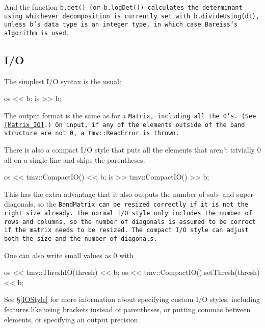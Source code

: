 And the function \tt{b.det()} (or \tt{b.logDet()}) calculates the determinant
using whichever decomposition is currently set with \tt{b.divideUsing(dt)},
unless \tt{b}'s data type is an integer type, in which case Bareiss's algorithm 
is used.

\subsection{I/O}
\label{BandMatrix_IO}

The simplest I/O syntax is the usual:
\begin{tmvcode}
os << b;
is >> b;
\end{tmvcode}
The output format is the same as for a \tt{Matrix}, including all the 0's.
(See \ref{Matrix_IO}.)  On input, if any of the elements outside of the band structure
are not 0, a \tt{tmv::ReadError} is thrown.

There is also a compact I/O style that puts all the elements that aren't trivially 0 all on a single line and skips the parentheses. 
\begin{tmvcode}
os << tmv::CompactIO() << b;
is >> tmv::CompactIO() >> b;
\end{tmvcode}
This has the extra advantage that it also outputs the number of sub- and super-diagonals, so the \tt{BandMatrix} can be resized correctly if it is not the right size already.  The normal I/O style only includes the number of rows and columns, so the number of diagonals is assumed to be correct if the matrix needs to be resized.  The compact I/O style can adjust both the size and the number of diagonals.

One can also write small values as 0 with
\begin{tmvcode}
os << tmv::ThreshIO(thresh) << b;
os << tmv::CompactIO().setThresh(thresh) << b;
\end{tmvcode}

See \S\ref{IOStyle} for more information about specifying custom I/O styles, including
features like using brackets instead of parentheses, or putting commas between elements,
or specifying an output precision.  
